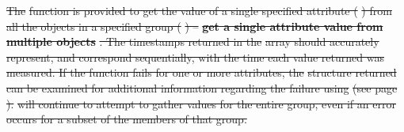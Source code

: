 \documentclass[12pt]{report} %
\providecommand{\DIFdeltex}[1]{{\protect\color{red}\sout{#1}}}                      %
\providecommand{\DIFaddend}{} %
\providecommand{\DIFdelbegin}{} %
\providecommand{\DIFdel}[1]{\texorpdfstring{\DIFdeltex{#1}}{}} %
\newcommand{\DIFscaledelfig}{0.5}
\newlength{\DIFdelgraphicswidth} %
\newlength{\DIFdelgraphicsheight} %
\newcommand{\DIFdelincludegraphics}[2][]{%
\sbox{\DIFdelgraphicsbox}{\DIFOincludegraphics[#1]{#2}}%
\settoboxwidth{\DIFdelgraphicswidth}{\DIFdelgraphicsbox} %
\settoboxtotalheight{\DIFdelgraphicsheight}{\DIFdelgraphicsbox} %
\scalebox{\DIFscaledelfig}{%
\parbox[b]{\DIFdelgraphicswidth}{\usebox{\DIFdelgraphicsbox}\\[-\baselineskip] \rule{\DIFdelgraphicswidth}{0em}}\llap{\resizebox{\DIFdelgraphicswidth}{\DIFdelgraphicsheight}{%
\setlength{\unitlength}{\DIFdelgraphicswidth}%
\begin{picture}(1,1)%
\thicklines\linethickness{2pt} %
{\color[rgb]{1,0,0}\put(0,0){\framebox(1,1){}}}%
{\color[rgb]{1,0,0}\put(0,0){\line( 1,1){1}}}%
{\color[rgb]{1,0,0}\put(0,1){\line(1,-1){1}}}%
\end{picture}%
}\hspace*{3pt}}} %
} %
\DeclareRobustCommand{\DIFaddend}{\DIFOaddend \let\includegraphics\DIFOincludegraphics} %
\DeclareRobustCommand{\DIFdelbegin}{\DIFOdelbegin \let\includegraphics\DIFdelincludegraphics} %
\begin{document}
\DIFaddend 

\DIFdelbegin %

\DIFdel{The }%
\DIFdel{function is provided to get the value of a single specified attribute (}%
\DIFdel{) from all the objects in a specified group (}%
\DIFdel{) -- }\textbf{\DIFdel{get a single attribute value from multiple objects}}%
\DIFdel{.
The timestamps returned in the }%
\DIFdel{array should accurately represent, and correspond sequentially, with the time each value returned was measured.
If the function fails for one or more attributes, the }%
\DIFdel{structure returned can be examined for additional information regarding the failure using }%
\DIFdel{(see page \pageref{func:StatusPopError}).
}%
\DIFdel{will continue to attempt to gather values for the entire group, even if an error occurs for a subset of the members of that group.
}%

\end{document}
